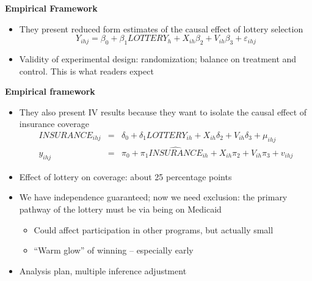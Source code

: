 \documentclass[notes=show]{beamer}
\begin{document}
\begin{frame}[plain]
	\begin{center}
	\textbf{Empirical Framework}
	\end{center}
	
	\begin{itemize}
	\item They present reduced form estimates of the causal effect of lottery selection$$Y_{ihj} = \beta_0 + \beta_1LOTTERY_{h} + X_{ih}\beta_2+V_{ih}\beta_3 + \varepsilon_{ihj}$$
	\item Validity of experimental design: randomization; balance on treatment and control. This is what readers expect
	\end{itemize}
\end{frame}


\begin{frame}[plain]
\begin{center}
\textbf{Empirical framework}
\end{center}

\begin{itemize}
	\item They also present IV results because they want to isolate the causal effect of insurance coverage
		\begin{eqnarray*}
		INSURANCE_{ihj} &=& \delta_0 + \delta_1LOTTERY_{ih} + X_{ih}\delta_2 + V_{ih}\delta_3 + \mu_{ihj} \\
		y_{ihj} &=& \pi_0 + \pi_1 \widehat{INSURANCE}_{ih} + X_{ih}\pi_2 + V_{ih}\pi_3 + v_{ihj}
		\end{eqnarray*}
		\item Effect of lottery on coverage: about 25 percentage points
		\item We have independence guaranteed; now we need exclusion: the primary pathway of the lottery must be via being on Medicaid
			\begin{itemize}
			\item Could affect participation in other programs, but actually small
			\item ``Warm glow'' of winning -- especially early
			\end{itemize}
	\item Analysis plan, multiple inference adjustment
\end{itemize}
\end{frame}
\end{document}
